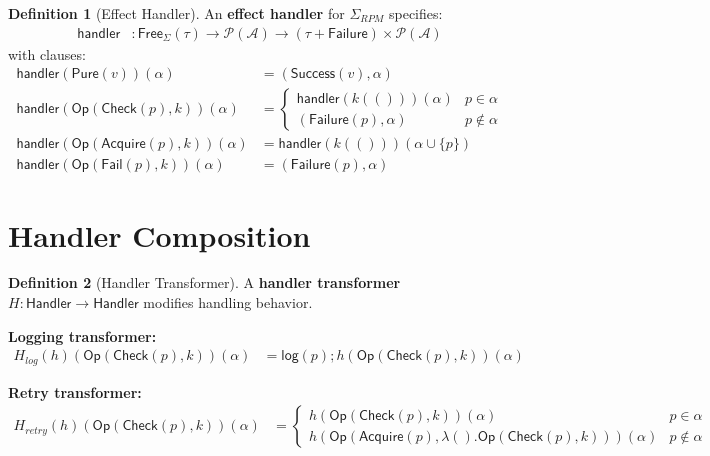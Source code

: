 \documentclass[11pt,twoside,openright]{book}
\theoremstyle{definition}
\newtheorem{definition}{Definition}[chapter]
\theoremstyle{plain}
\theoremstyle{remark}
\newcommand{\Acquisitions}{\mathcal{A}}
\begin{document}
\begin{definition}[Effect Handler]
\label{def:effect-handler}
An \textbf{effect handler} for $\Sigma_{RPM}$ specifies:
\begin{align}
\mathsf{handler} &: \mathsf{Free}_\Sigma(\tau) \to \mathcal{P}(\Acquisitions) \to (\tau + \mathsf{Failure}) \times \mathcal{P}(\Acquisitions)
\end{align}
with clauses:
\begin{align}
\mathsf{handler}(\mathsf{Pure}(v))(\alpha) &= (\mathsf{Success}(v), \alpha) \\
\mathsf{handler}(\mathsf{Op}(\mathsf{Check}(p), k))(\alpha) &=
  \begin{cases}
    \mathsf{handler}(k(()))(\alpha) & p \in \alpha \\
    (\mathsf{Failure}(p), \alpha) & p \notin \alpha
  \end{cases} \\
\mathsf{handler}(\mathsf{Op}(\mathsf{Acquire}(p), k))(\alpha) &= \mathsf{handler}(k(()))(\alpha \cup \{p\}) \\
\mathsf{handler}(\mathsf{Op}(\mathsf{Fail}(p), k))(\alpha) &= (\mathsf{Failure}(p), \alpha)
\end{align}
\end{definition}

\section{Handler Composition}

\begin{definition}[Handler Transformer]
\label{def:handler-transformer}
A \textbf{handler transformer} $H : \mathsf{Handler} \to \mathsf{Handler}$ modifies handling behavior.

\textbf{Logging transformer:}
\begin{align}
H_{log}(h)(\mathsf{Op}(\mathsf{Check}(p), k))(\alpha) &= \mathsf{log}(p) \mathbin{;} h(\mathsf{Op}(\mathsf{Check}(p), k))(\alpha)
\end{align}

\textbf{Retry transformer:}
\begin{align}
H_{retry}(h)(\mathsf{Op}(\mathsf{Check}(p), k))(\alpha) &=
  \begin{cases}
    h(\mathsf{Op}(\mathsf{Check}(p), k))(\alpha) & p \in \alpha \\
    h(\mathsf{Op}(\mathsf{Acquire}(p), \lambda (). \mathsf{Op}(\mathsf{Check}(p), k)))(\alpha) & p \notin \alpha
  \end{cases}
\end{align}
\end{definition}
\end{document}
